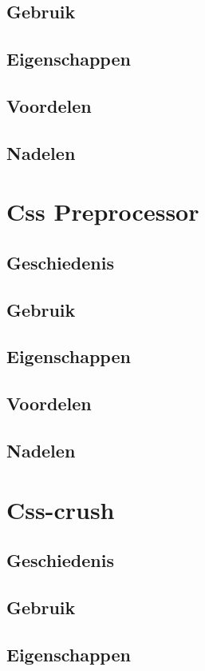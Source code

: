 \documentclass[pdftex,a4paper,12pt,twoside]{report}
\begin{document}
\subsection{Gebruik}
\subsection{Eigenschappen}
\subsection{Voordelen}
\subsection{Nadelen}



\section{Css Preprocessor}
\subsection{Geschiedenis}
\subsection{Gebruik}
\subsection{Eigenschappen}
\subsection{Voordelen}
\subsection{Nadelen}


\section{Css-crush}
\subsection{Geschiedenis}
\subsection{Gebruik}
\subsection{Eigenschappen}
\end{document}
